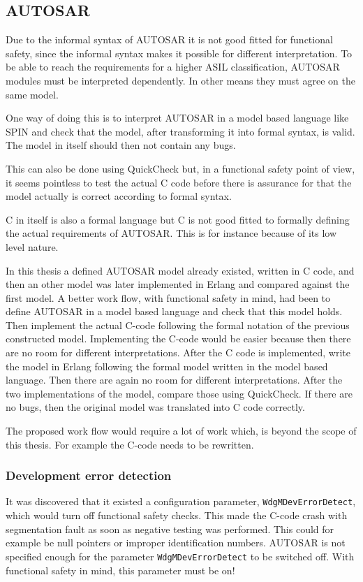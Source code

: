 \subsection{AUTOSAR}
Due to the informal syntax of AUTOSAR it is not good fitted for
functional safety, since the informal syntax makes it possible for
different interpretation. To be able to reach the requirements for a higher
ASIL classification, AUTOSAR modules must be interpreted dependently. In other
means they must agree on the same model.

One way of doing this is to interpret AUTOSAR in a model based
language like SPIN and check that the model, after transforming it
into formal syntax, is valid. The model in itself should then not
contain any bugs.

This can also be done using QuickCheck but, in a functional safety
point of view, it seems pointless to test the actual C code before
there is assurance for that the model actually is correct according to
formal syntax.

C in itself is also a formal language but C is not good fitted to
formally defining the actual requirements of AUTOSAR. This is for
instance because of its low level nature.

In this thesis a defined AUTOSAR model already existed, written in C
code, and then an other model was later implemented in Erlang and
compared against the first model. A better work flow, with functional
safety in mind, had been to define AUTOSAR in a model based language
and check that this model holds. Then implement the actual C-code
following the formal notation of the previous constructed
model. Implementing the C-code would be easier because then there are
no room for different interpretations. After the C code is
implemented, write the model in Erlang following the formal model
written in the model based language. Then there are again no room for
different interpretations. After the two implementations of the model,
compare those using QuickCheck. If there are no bugs, then the
original model was translated into C code correctly.

The proposed work flow would require a lot of work which, is beyond the scope of
this thesis. For example the C-code needs to be rewritten.

\subsubsection{Development error detection}
\label{SEC:DEVERRORDETECT}
It was discovered that it existed a configuration parameter,
\lstinline!WdgMDevErrorDetect!, which would turn off functional safety
checks. This made the C-code crash with segmentation fault as soon as
negative testing was performed. This could for example be null pointers or
improper identification numbers. AUTOSAR is not specified enough for
the parameter \lstinline!WdgMDevErrorDetect!  to be switched off. With
functional safety in mind, this parameter must be on!

